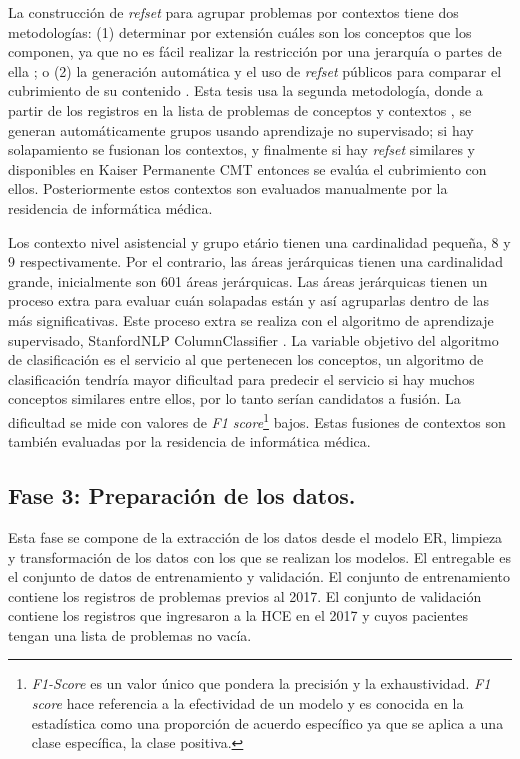La construcción de  \textit{\acrshort{refset} } para agrupar problemas por contextos tiene dos metodologías: (1) determinar por extensión cuáles son los conceptos que los componen, ya que no es fácil realizar la restricción por una jerarquía o partes de ella \cite{Hjen2014MethodsSets.,Lee2013AImplementations.}; o (2) la generación automática y el uso de \textit{\acrshort{refset} } públicos para comparar el cubrimiento de su contenido \cite{Lee2013AImplementations.}. Esta tesis usa la segunda metodología, donde a partir de los registros en la lista de problemas de conceptos y  contextos , se generan automáticamente grupos usando aprendizaje no supervisado;  si hay solapamiento se fusionan los contextos,  y finalmente si hay \textit{\acrshort{refset} } similares y disponibles en Kaiser Permanente CMT entonces se evalúa el cubrimiento con ellos.  Posteriormente estos contextos son evaluados manualmente por la residencia de informática médica.  

Los contexto  nivel asistencial y grupo etário tienen una cardinalidad pequeña, 8 y 9 respectivamente. Por el contrario, las áreas jerárquicas tienen una cardinalidad grande, inicialmente son 601 áreas jerárquicas. Las áreas jerárquicas tienen un proceso extra para evaluar  cuán solapadas están y así agruparlas dentro de las más significativas. Este proceso extra se realiza con el algoritmo de aprendizaje supervisado, StanfordNLP ColumnClassifier \cite{manning-EtAl:2014:P14-5}. La variable objetivo del algoritmo de clasificación es  el servicio al que pertenecen los conceptos, un algoritmo de clasificación tendría mayor dificultad para predecir el servicio si hay muchos conceptos similares entre ellos, por lo tanto serían candidatos a fusión. La dificultad se mide con valores de \textit{F1 score}\footnote{\textit{F1-Score} es un valor único que pondera la precisión y la exhaustividad. \textit{F1 score} hace referencia a la efectividad de un modelo y es conocida en la estadística como una proporción de acuerdo específico ya que se aplica a una clase específica, la clase positiva.\cite{Powers2011Evaluation:Correlation}} bajos. Estas fusiones de contextos son también evaluadas por la residencia de informática médica.


\subsection{Fase 3: Preparación de los datos.} Esta fase se compone de la extracción de los datos desde el modelo ER, limpieza y transformación de los datos con los que se realizan los modelos. El entregable es el conjunto de datos de entrenamiento y validación. El conjunto de entrenamiento contiene los registros de problemas previos al 2017. El conjunto de validación contiene los registros que ingresaron a la \acrshort{HCE} en el 2017 y cuyos pacientes tengan una lista de problemas no vacía.


